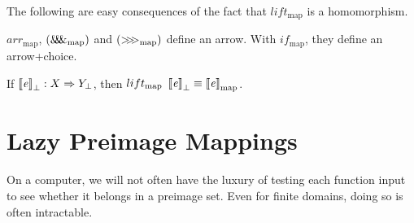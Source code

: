 \documentclass[preprint]{sigplanconf}
\newcommand{\arrow}{\rightsquigarrow}
\newcommand{\arrowlift}{\ensuremath{lift}}
\newcommand{\arrowarr}{\ensuremath{arr}}
\newcommand{\arrowcomp}{\ensuremath{{>}\mspace{-6mu}{>}\mspace{-6mu}{>}}}
\newcommand{\arrowpair}{\ensuremath{\mathit{\&\mspace{-7.5mu}\&\mspace{-7.5mu}\&}}}
\newcommand{\arrowif}{\ensuremath{if}}
\newcommand{\map}{_\mathrm{map}}
\DeclareMathOperator{\mapto}{\arrow_{\mspace{-21mu}\map}}
\newcommand{\liftmap}{\arrowlift\map}
\newcommand{\arrmap}{\arrowarr\map}
\newcommand{\compmap}{\arrowcomp\map}
\newcommand{\pairmap}{\arrowpair\map}
\newcommand{\ifmap}{\arrowif\map}
\begin{document}
The following are easy consequences of the fact that $\liftmap$ is a homomorphism.

\begin{corollary}
$\arrmap$, $(\pairmap)$ and $(\compmap)$ define an arrow.
With $\ifmap$, they define an arrow+choice.
\end{corollary}

\begin{comment}
\begin{corollary}
Let $f : X \tto Y_\bot$ and $g : X \mapto Y$ its corresponding mapping arrow computation.
For all $A \subseteq X$, $g~A$ diverges if and only if there exists an $x \in A$ for which $f~x$ diverges.
\end{corollary}
\end{comment}

\begin{corollary}
If $\left\llbracket{\mathit{e}}\right\rrbracket_\bot : X \Rightarrow Y_\bot$, then $lift\map~\meaningof{\mathit{e}}_\bot \equiv \meaningof{\mathit{e}}\map$.
\end{corollary}



\section{Lazy Preimage Mappings}

On a computer, we will not often have the luxury of testing each function input to see whether it belongs in a preimage set.
Even for finite domains, doing so is often intractable.
\end{document}
